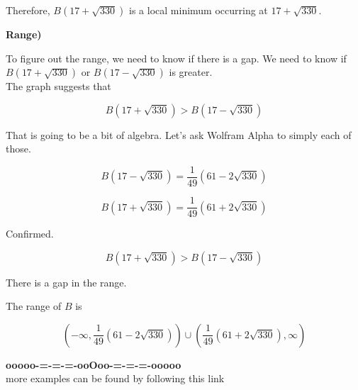 \documentclass{ximera}
\begin{document}
\begin{example}
Therefore, $B(17 + \sqrt{330})$ is a local minimum occurring at $17 + \sqrt{330}$.









\textbf{Range)}


To figure out the range, we need to know if there is a gap.  We need to know if $B(17 + \sqrt{330})$ or $B(17 - \sqrt{330})$ is greater. \\

The graph suggests that 

\[
B(17 + \sqrt{330})  > B(17 - \sqrt{330})
\]


That is going to be a bit of algebra. Let's ask Wolfram Alpha to simply each of those.



\[
B(17 - \sqrt{330}) = \frac{1}{49} (61 - 2 \sqrt{330})
\]




\[
B(17 + \sqrt{330})  =  \frac{1}{49} (61 + 2 \sqrt{330})
\]


Confirmed.


\[
B(17 + \sqrt{330})  > B(17 - \sqrt{330})
\]


There is a gap in the range.


The range of $B$ is 


\[
\left( -\infty, \frac{1}{49} (61 - 2 \sqrt{330}) \right) \cup  \left( \frac{1}{49} (61 + 2 \sqrt{330}), \infty \right) 
\]





\end{example}














\begin{center}
\textbf{\textcolor{green!50!black}{ooooo-=-=-=-ooOoo-=-=-=-ooooo}} \\

more examples can be found by following this link\\ 

\end{center}
\end{document}
